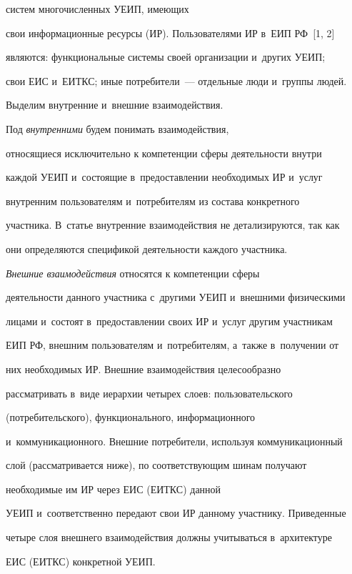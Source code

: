 систем многочисленных УЕИП, имеющих 

свои информационные ресурсы (ИР). Пользователями ИР в~ЕИП РФ~[1, 2] 

являются: функциональные системы своей организации и~других УЕИП; 

свои ЕИС и~ЕИТКС; иные потребители~--- отдельные люди и~группы людей. 

     

     Выделим внутренние и~внешние взаимодействия.

     

     Под \textit{внутренними} будем понимать взаимодействия, 

относящиеся исключительно к компетенции сферы деятельности внутри 

каждой УЕИП и~состоящие в~предоставлении необходимых ИР и~услуг 

внутренним пользователям и~потребителям из состава конкретного 

участника. В~статье внутренние взаимодействия не детализируются, так как 

они определяются спецификой деятельности каждого участника.

     

     \textit{Внешние взаимодействия} относятся к компетенции сферы 

деятельности данного участника с~другими УЕИП и~внешними физическими 

лицами и~состоят в~предоставлении своих ИР и~услуг другим участникам 

ЕИП РФ, внешним пользователям и~потребителям, а~также в~получении от 

них необходимых ИР. Внешние взаимодействия целесообразно 

рассматривать в~виде иерархии четырех слоев: пользовательского 

(потребительского), функционального, информационного 

и~коммуникационного. Внешние потребители, используя коммуникационный 

слой (рассматривается ниже), по соответствующим шинам получают 

необходимые им ИР через ЕИС (ЕИТКС) данной 

УЕИП и~соответственно передают свои ИР данному участнику. Приведенные 

четыре слоя внешнего взаимодействия должны учитываться в~архитектуре 

ЕИС (ЕИТКС) конкретной УЕИП.

